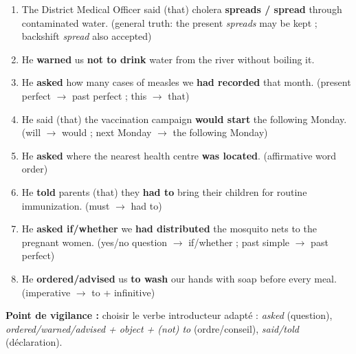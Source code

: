 \documentclass[11pt]{article}
\begin{document}
\begin{corrige}
\begin{enumerate}
    \item The District Medical Officer said (that) cholera \textbf{spreads / spread} through contaminated water. (general truth: the present \emph{spreads} may be kept ; backshift \emph{spread} also accepted)
    \item He \textbf{warned} us \textbf{not to drink} water from the river without boiling it.
    \item He \textbf{asked} how many cases of measles we \textbf{had recorded} that month. (present perfect $\rightarrow$ past perfect ; this $\rightarrow$ that)
    \item He said (that) the vaccination campaign \textbf{would start} the following Monday. (will $\rightarrow$ would ; next Monday $\rightarrow$ the following Monday)
    \item He \textbf{asked} where the nearest health centre \textbf{was located}. (affirmative word order)
    \item He \textbf{told} parents (that) they \textbf{had to} bring their children for routine immunization. (must $\rightarrow$ had to)
    \item He \textbf{asked if/whether} we \textbf{had distributed} the mosquito nets to the pregnant women. (yes/no question $\rightarrow$ if/whether ; past simple $\rightarrow$ past perfect)
    \item He \textbf{ordered/advised} us \textbf{to wash} our hands with soap before every meal. (imperative $\rightarrow$ to + infinitive)
\end{enumerate}
\textbf{Point de vigilance :} choisir le verbe introducteur adapté : \emph{asked} (question), \emph{ordered/warned/advised + object + (not) to} (ordre/conseil), \emph{said/told} (déclaration).
\end{corrige}
\end{document}
